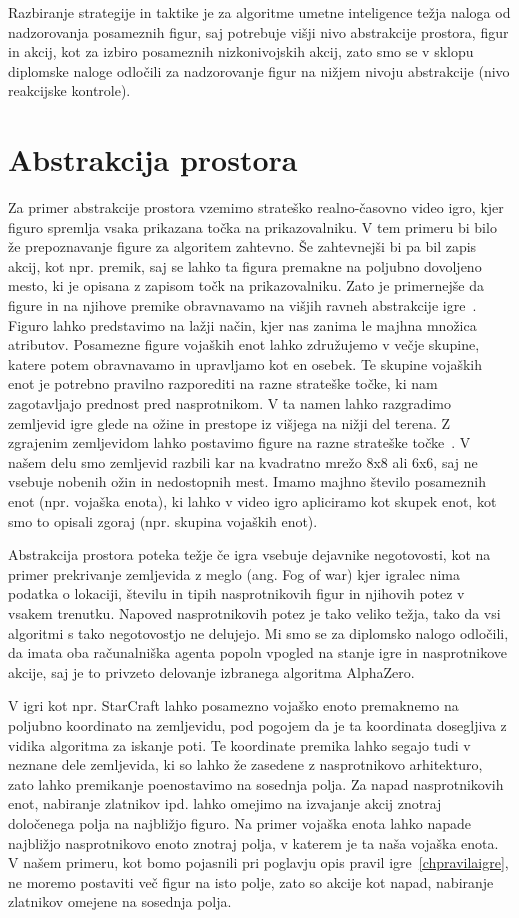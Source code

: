 \documentclass[a4paper, 12pt]{book}
\begin{document}
Razbiranje strategije in taktike je za algoritme umetne inteligence težja naloga od nadzorovanja posameznih figur, saj potrebuje višji nivo abstrakcije prostora, figur in akcij, kot za izbiro posameznih nizkonivojskih akcij, zato smo se v sklopu diplomske naloge odločili za nadzorovanje figur na nižjem nivoju abstrakcije (nivo reakcijske kontrole).

\section{Abstrakcija prostora}
Za primer abstrakcije prostora vzemimo strateško realno-časovno  video igro, kjer figuro spremlja vsaka prikazana točka na prikazovalniku.
V tem primeru bi bilo že prepoznavanje figure za algoritem zahtevno. 
Še zahtevnejši bi pa bil zapis akcij, kot npr. premik, saj se lahko ta figura premakne na poljubno dovoljeno mesto, ki je opisana z zapisom točk na prikazovalniku.
Zato je primernejše da figure in na njihove premike obravnavamo na višjih ravneh abstrakcije igre~\cite{uriarte2015automatic}.
Figuro lahko predstavimo na lažji način, kjer nas zanima le majhna množica atributov.
Posamezne figure vojaških enot lahko združujemo v večje skupine, katere potem obravnavamo in upravljamo kot en osebek.
Te skupine vojaških enot je potrebno pravilno razporediti na razne strateške točke, ki nam zagotavljajo prednost pred nasprotnikom.
V ta namen lahko razgradimo zemljevid igre glede na ožine in prestope iz višjega na nižji del terena.
Z zgrajenim zemljevidom lahko postavimo figure na razne strateške točke~\cite{uriarte2014game}.
V našem delu smo zemljevid razbili kar na kvadratno mrežo 8x8 ali 6x6, saj ne vsebuje nobenih ožin in nedostopnih mest.
Imamo majhno število posameznih enot (npr. vojaška enota), ki lahko v video igro apliciramo kot skupek enot, kot smo to opisali zgoraj (npr. skupina vojaških enot).

Abstrakcija prostora poteka težje če igra vsebuje dejavnike negotovosti, kot na primer prekrivanje zemljevida z meglo (ang. Fog of war) kjer igralec nima podatka o lokaciji, številu in tipih nasprotnikovih figur in njihovih potez v vsakem trenutku. 
Napoved nasprotnikovih potez je tako veliko težja, tako da vsi algoritmi s tako negotovostjo ne delujejo.
Mi smo se za diplomsko nalogo odločili, da imata oba računalniška agenta popoln vpogled na stanje igre in nasprotnikove akcije, saj je to privzeto delovanje izbranega algoritma AlphaZero.

V igri kot npr. StarCraft lahko posamezno vojaško enoto premaknemo na poljubno koordinato na zemljevidu, pod pogojem da je ta koordinata dosegljiva z vidika algoritma za iskanje poti.
Te koordinate premika lahko segajo tudi v neznane dele zemljevida, ki so lahko že zasedene z nasprotnikovo arhitekturo, zato lahko premikanje poenostavimo na sosednja polja.
Za napad nasprotnikovih enot, nabiranje zlatnikov ipd. lahko omejimo na izvajanje akcij znotraj določenega polja na najbližjo figuro.
Na primer vojaška enota lahko napade najbližjo nasprotnikovo enoto znotraj polja, v katerem je ta naša vojaška enota.
V našem primeru, kot bomo pojasnili pri poglavju opis pravil igre~\ref{chpravilaigre}, ne moremo postaviti več figur na isto polje, zato so akcije kot napad, nabiranje zlatnikov omejene na sosednja polja.
\end{document}
